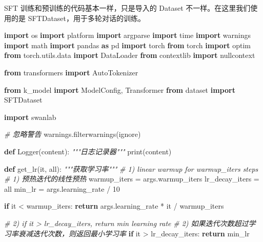 \documentclass[
]{article}
\newenvironment{Shaded}{}{}
\newcommand{\BuiltInTok}[1]{\textcolor[rgb]{0.00,0.50,0.00}{#1}}
\newcommand{\CommentTok}[1]{\textcolor[rgb]{0.38,0.63,0.69}{\textit{#1}}}
\newcommand{\ControlFlowTok}[1]{\textcolor[rgb]{0.00,0.44,0.13}{\textbf{#1}}}
\newcommand{\DecValTok}[1]{\textcolor[rgb]{0.25,0.63,0.44}{#1}}
\newcommand{\ImportTok}[1]{\textcolor[rgb]{0.00,0.50,0.00}{\textbf{#1}}}
\newcommand{\KeywordTok}[1]{\textcolor[rgb]{0.00,0.44,0.13}{\textbf{#1}}}
\newcommand{\NormalTok}[1]{#1}
\newcommand{\OperatorTok}[1]{\textcolor[rgb]{0.40,0.40,0.40}{#1}}
\newcommand{\StringTok}[1]{\textcolor[rgb]{0.25,0.44,0.63}{#1}}
\begin{document}
SFT 训练和预训练的代码基本一样，只是导入的 Dataset
不一样。在这里我们使用的是 SFTDataset，用于多轮对话的训练。

\begin{Shaded}
\begin{Highlighting}[]
\ImportTok{import}\NormalTok{ os}
\ImportTok{import}\NormalTok{ platform}
\ImportTok{import}\NormalTok{ argparse}
\ImportTok{import}\NormalTok{ time}
\ImportTok{import}\NormalTok{ warnings}
\ImportTok{import}\NormalTok{ math}
\ImportTok{import}\NormalTok{ pandas }\ImportTok{as}\NormalTok{ pd}
\ImportTok{import}\NormalTok{ torch}
\ImportTok{from}\NormalTok{ torch }\ImportTok{import}\NormalTok{ optim}
\ImportTok{from}\NormalTok{ torch.utils.data }\ImportTok{import}\NormalTok{ DataLoader}
\ImportTok{from}\NormalTok{ contextlib }\ImportTok{import}\NormalTok{ nullcontext}

\ImportTok{from}\NormalTok{ transformers }\ImportTok{import}\NormalTok{ AutoTokenizer}

\ImportTok{from}\NormalTok{ k\_model }\ImportTok{import}\NormalTok{ ModelConfig, Transformer}
\ImportTok{from}\NormalTok{ dataset }\ImportTok{import}\NormalTok{ SFTDataset}

\ImportTok{import}\NormalTok{ swanlab}

\CommentTok{\# 忽略警告}
\NormalTok{warnings.filterwarnings(}\StringTok{\textquotesingle{}ignore\textquotesingle{}}\NormalTok{)}


\KeywordTok{def}\NormalTok{ Logger(content):}
    \CommentTok{"""日志记录器"""}
    \BuiltInTok{print}\NormalTok{(content)}

\KeywordTok{def}\NormalTok{ get\_lr(it, }\BuiltInTok{all}\NormalTok{):}
    \CommentTok{"""获取学习率"""}
    \CommentTok{\# 1) linear warmup for warmup\_iters steps}
    \CommentTok{\# 1) 预热迭代的线性预热}
\NormalTok{    warmup\_iters }\OperatorTok{=}\NormalTok{ args.warmup\_iters}
\NormalTok{    lr\_decay\_iters }\OperatorTok{=} \BuiltInTok{all}
\NormalTok{    min\_lr }\OperatorTok{=}\NormalTok{ args.learning\_rate }\OperatorTok{/} \DecValTok{10}

    \ControlFlowTok{if}\NormalTok{ it }\OperatorTok{\textless{}}\NormalTok{ warmup\_iters:}
        \ControlFlowTok{return}\NormalTok{ args.learning\_rate }\OperatorTok{*}\NormalTok{ it }\OperatorTok{/}\NormalTok{ warmup\_iters}
    
    \CommentTok{\# 2) if it \textgreater{} lr\_decay\_iters, return min learning rate}
    \CommentTok{\# 2) 如果迭代次数超过学习率衰减迭代次数，则返回最小学习率}
    \ControlFlowTok{if}\NormalTok{ it }\OperatorTok{\textgreater{}}\NormalTok{ lr\_decay\_iters:}
        \ControlFlowTok{return}\NormalTok{ min\_lr}
    

\end{Highlighting}
\end{Shaded}
\end{document}
